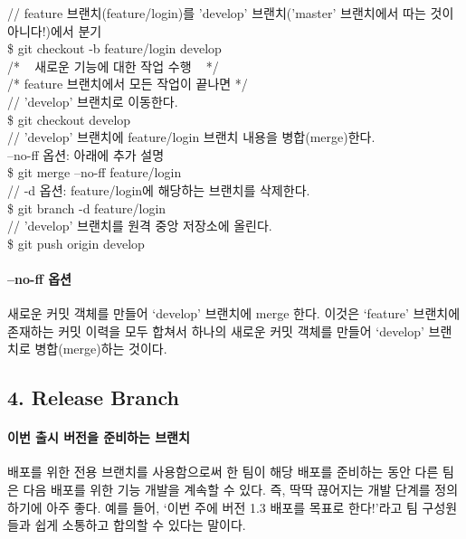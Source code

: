 \documentclass[12pt, a4paper, oneside]{book}
\begin{document}
		\begin{tcolorbox}
			// feature 브랜치(feature/login)를 'develop' 브랜치('master' 브랜치에서 따는 것이 아니다!)에서 분기\\
			\$ git checkout -b feature/login develop\\
			/* ~ 새로운 기능에 대한 작업 수행 ~ */\\

		/* feature 브랜치에서 모든 작업이 끝나면 */\\
		// 'develop' 브랜치로 이동한다.\\
		\$ git checkout develop \\
		// 'develop' 브랜치에 feature/login 브랜치 내용을 병합(merge)한다. \\
		 --no-ff 옵션: 아래에 추가 설명\\
		\$ git merge --no-ff feature/login\\
		// -d 옵션: feature/login에 해당하는 브랜치를 삭제한다.\\
		\$ git branch -d feature/login	\\
		// 'develop' 브랜치를 원격 중앙 저장소에 올린다.	\\
		\$ git push origin develop 
		\end{tcolorbox}

		\paragraph{--no-ff 옵션}
		새로운 커밋 객체를 만들어 ‘develop’ 브랜치에 merge 한다.
		이것은 ‘feature’ 브랜치에 존재하는 커밋 이력을 모두 합쳐서 
		하나의 새로운 커밋 객체를 만들어 ‘develop’ 브랜치로 병합(merge)하는 것이다.




	\subsection{4. Release Branch}

			\paragraph{이번 출시 버전을 준비하는 브랜치}
			배포를 위한 전용 브랜치를 사용함으로써 한 팀이 해당 배포를 준비하는 동안 다른 팀은 다음 배포를 위한 기능 개발을 계속할 수 있다. 
			즉, 딱딱 끊어지는 개발 단계를 정의하기에 아주 좋다.
			예를 들어, ‘이번 주에 버전 1.3 배포를 목표로 한다!’라고 팀 구성원들과 쉽게 소통하고 합의할 수 있다는 말이다.
			
\end{document}
